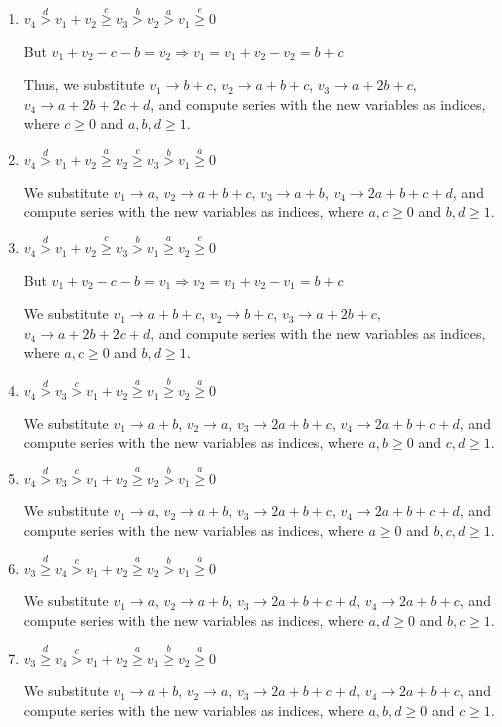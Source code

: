 \documentclass{article}
\begin{document}
\begin{enumerate}
\item 
$v_4\overset{d}{>}v_1+v_2\overset{c}{\geq}v_3\overset{b}{>}{v_2}\overset{a}{>}v_1\overset{e}{\geq}{0}$

But $v_1+v_2-c-b=v_2\Rightarrow{v_1=v_1+v_2-v_2=b+c}$

Thus, we substitute 
$v_1\rightarrow{b+c}$, 
$v_2\rightarrow{a+b+c}$, 
$v_3\rightarrow{a+2b+c}$, 
$v_4\rightarrow{a+2b+2c+d}$, and compute series with the new variables as indices, where $c\geq{0}$ and $a,b,d\geq{1}$.
\item 
$v_4\overset{d}{>}v_1+v_2\overset{a}{\geq}v_2\overset{c}{\geq}{v_3}\overset{b}{>}v_1\overset{a}{\geq}{0}$

We substitute 
$v_1\rightarrow{a}$, 
$v_2\rightarrow{a+b+c}$, 
$v_3\rightarrow{a+b}$, 
$v_4\rightarrow{2a+b+c+d}$, and compute series with the new variables as indices, where $a,c\geq{0}$ and $b,d\geq{1}$.
\item 
$v_4\overset{d}{>}v_1+v_2\overset{c}{\geq}v_3\overset{b}{>}{v_1}\overset{a}{\geq}v_2\overset{e}{\geq}{0}$

But $v_1+v_2-c-b=v_1\Rightarrow{v_2=v_1+v_2-v_1=b+c}$

We substitute 
$v_1\rightarrow{a+b+c}$, 
$v_2\rightarrow{b+c}$, 
$v_3\rightarrow{a+2b+c}$, 
$v_4\rightarrow{a+2b+2c+d}$, and compute series with the new variables as indices, where $a,c\geq{0}$ and $b,d\geq{1}$.
\item 
$v_4\overset{d}{>}v_3\overset{c}{>}v_1+v_2\overset{a}{\geq}{v_1}\overset{b}{\geq}v_2\overset{a}{\geq}{0}$

We substitute 
$v_1\rightarrow{a+b}$, 
$v_2\rightarrow{a}$, 
$v_3\rightarrow{2a+b+c}$, 
$v_4\rightarrow{2a+b+c+d}$, and compute series with the new variables as indices, where $a,b\geq{0}$ and $c,d\geq{1}$.
\item 
$v_4\overset{d}{>}v_3\overset{c}{>}v_1+v_2\overset{a}{\geq}{v_2}\overset{b}{>}v_1\overset{a}{\geq}{0}$

We substitute 
$v_1\rightarrow{a}$, 
$v_2\rightarrow{a+b}$, 
$v_3\rightarrow{2a+b+c}$, 
$v_4\rightarrow{2a+b+c+d}$, and compute series with the new variables as indices, where $a\geq{0}$ and $b,c,d\geq{1}$.

\item 
$v_3\overset{d}{\geq}v_4\overset{c}{>}v_1+v_2\overset{a}{\geq}{v_2}\overset{b}{>}v_1\overset{a}{\geq}{0}$

We substitute 
$v_1\rightarrow{a}$, 
$v_2\rightarrow{a+b}$, 
$v_3\rightarrow{2a+b+c+d}$, 
$v_4\rightarrow{2a+b+c}$, and compute series with the new variables as indices, where $a,d\geq{0}$ and $b,c\geq{1}$.
\item 
$v_3\overset{d}{\geq}v_4\overset{c}{>}v_1+v_2\overset{a}{\geq}{v_1}\overset{b}{\geq}v_2\overset{a}{\geq}{0}$

We substitute 
$v_1\rightarrow{a+b}$, 
$v_2\rightarrow{a}$, 
$v_3\rightarrow{2a+b+c+d}$, 
$v_4\rightarrow{2a+b+c}$, and compute series with the new variables as indices, where $a,b,d\geq{0}$ and $c\geq{1}$.
\end{enumerate}
\end{document}
